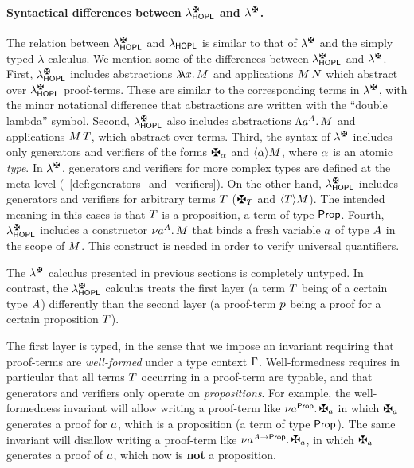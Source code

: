\paragraph{Syntactical differences between $\lambdaCheckHOPL$ and $\lambdaCheck$.}
The relation between $\lambdaCheckHOPL$ and ${\lambda}_{\mathsf{HOPL}}$
is similar to that of $\lambdaCheck$ and the simply typed $\lambda$-calculus.
We mention some of the differences between $\lambdaCheckHOPL$ and $\lambdaCheck$.
First,
  $\lambdaCheckHOPL$
  includes abstractions $\lambda\!\!\lambda{x}.\,M$
  and applications $M\,N$
  which abstract over $\lambdaCheckHOPL$ proof-terms.
  These are similar to the corresponding terms in $\lambdaCheck$,
  with the minor notational difference that abstractions are written
  with the ``double lambda'' symbol.
Second,
  $\lambdaCheckHOPL$
  also includes abstractions $\Lambda{a^{A}}.\,M$
  and applications $M\,T$,
  which abstract over terms.
Third,
  the syntax of $\lambdaCheck$
  includes only generators and verifiers of the forms
  $\gen{\btyp}$ and $\langle\alpha\rangle M$,
  where $\alpha$ is an atomic \emph{type}.
  In $\lambdaCheck$, generators and verifiers for more complex
  types are defined at the meta-level
  (\cf~\cref{def:generators_and_verifiers}).
  On the other hand, $\lambdaCheckHOPL$
  includes generators and verifiers for arbitrary terms $T$
  ($\gen{\ttm}$ and $\langle T\rangle M$).
  The intended meaning in this cases is that $T$ is a proposition,
  \ie a term of type $\mathsf{Prop}$.
Fourth, 
  $\lambdaCheckHOPL$ includes a constructor $\nu{a^{A}}.\,M$
  that binds a fresh variable $a$ of type $A$
  in the scope of $M$.
  This construct is needed in order to verify universal quantifiers.

The $\lambdaCheck$ calculus presented in previous sections is completely untyped.
In contrast,
the $\lambdaCheckHOPL$ calculus treats
the first layer (a term $T$ being of a certain type $A$)
differently than
the second layer (a proof-term $p$ being a proof for a certain proposition $T$).

The first layer is typed, in the sense that
we impose an invariant requiring that proof-terms are \emph{well-formed}
under a type context $\Gamma$. Well-formedness requires in particular that
all terms $T$ occurring in a proof-term are typable, and that generators
and verifiers only operate on \emph{propositions}.
For example, the well-formedness invariant will allow writing a proof-term
like $\fresh{\tvar}{\Prop}{\gen{\tvar}}$
in which $\gen{\tvar}$ generates a proof for $a$, which is a
proposition (\ie a term of type $\mathsf{Prop}$).
The same invariant will disallow writing a proof-term like
$\fresh{\tvar}{\typ\to\Prop}{\gen{\tvar}}$,
in which $\gen{\tvar}$ generates a proof of $a$, which now is \textbf{not}
a proposition.

